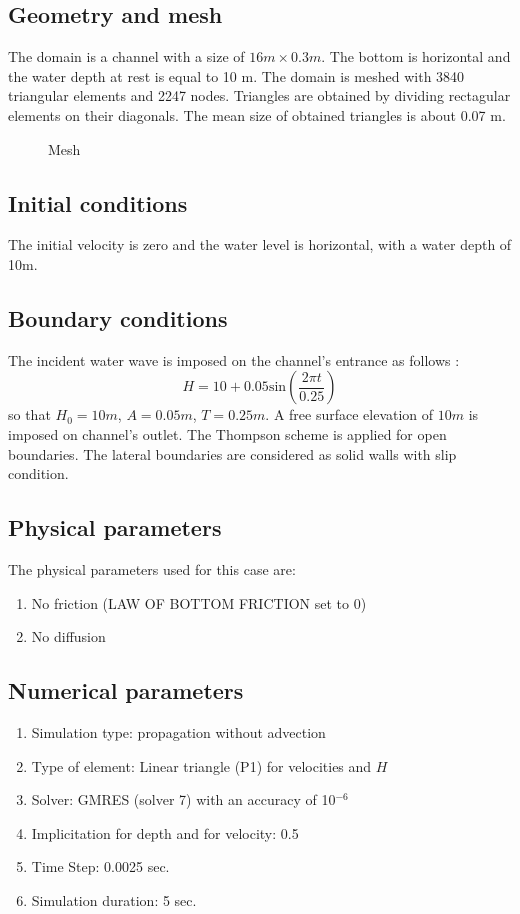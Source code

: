 \subsection{Geometry and mesh}
The domain is a channel with a size of $16 m \times 0.3 m$. The bottom is horizontal and
the water depth at rest is equal to 10 m.
The domain is meshed with 3840 triangular elements and 2247 nodes.
Triangles are obtained by dividing rectagular elements on their diagonals.
The mean size of obtained triangles is about 0.07 m.

\begin{figure}[H]
 \centering
  \caption{Mesh}\label{fig:wave:mesh}
\end{figure}

\subsection{Initial conditions}
The initial velocity is zero and the water level is horizontal, with a water depth of 10m.
\subsection{Boundary conditions}
The incident water wave is imposed on the channel's entrance as follows :
\begin{equation}
    H = 10 + 0.05 \text{sin}\left( \dfrac{2\pi t}{0.25} \right)
\end{equation}
so that $H_0=10m$, $A=0.05m$, $T=0.25m$.
A free surface elevation of $10m$ is imposed on channel's outlet.
The Thompson scheme is applied for open boundaries.
The lateral boundaries are considered as solid walls with slip condition.
\subsection{Physical parameters}
The physical parameters used for this case are:
\begin{enumerate}
\item No friction (LAW OF BOTTOM FRICTION set to 0)
\item No diffusion
\end{enumerate}
\subsection{Numerical parameters}
\begin{enumerate}
\item Simulation type: propagation without advection
\item Type of element: Linear triangle (P1) for velocities and $H$
\item Solver: GMRES (solver 7) with an accuracy of 10${}^{-6}$
\item Implicitation for depth and for velocity: 0.5
\item Time Step: 0.0025 sec.
\item Simulation duration: 5 sec.
\end{enumerate}

